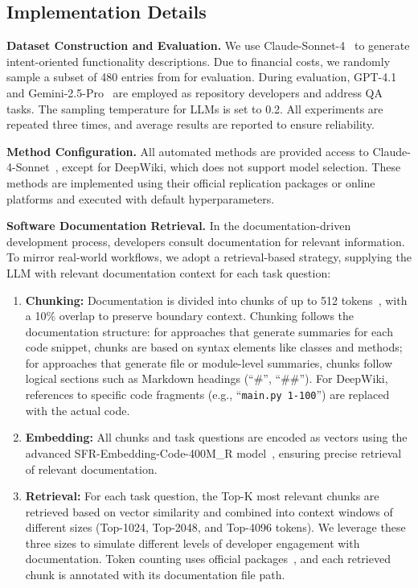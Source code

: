 \subsection{Implementation Details}
\label{sec:impl_detail}
\textbf{Dataset Construction and Evaluation.}
We use Claude-Sonnet-4~\cite{claude} to generate intent-oriented functionality descriptions. Due to financial costs, we randomly sample a subset of 480 entries from \benchmark for evaluation. During evaluation, GPT-4.1~\cite{gpt} and Gemini-2.5-Pro~\cite{gemini} are employed as repository developers and address QA tasks. The sampling temperature for LLMs is set to 0.2. All experiments are repeated three times, and average results are reported to ensure reliability.

\textbf{Method Configuration.}
All automated methods are provided access to Claude-4-Sonnet~\cite{claude}, except for DeepWiki, which does not support model selection. These methods are implemented using their official replication packages or online platforms and executed with default hyperparameters.



\textbf{Software Documentation Retrieval.}
In the documentation-driven development process, developers consult documentation for relevant information. To mirror real-world workflows, we adopt a retrieval-based strategy, supplying the LLM with relevant documentation context for each task question:

\begin{enumerate}[leftmargin=*]
\item \textbf{Chunking:} Documentation is divided into chunks of up to 512 tokens~\cite{sfr, coir}, with a 10\% overlap to preserve boundary context. Chunking follows the documentation structure: for approaches that generate summaries for each code snippet, chunks are based on syntax elements like classes and methods; for approaches that generate file or module-level summaries, chunks follow logical sections such as Markdown headings (``\#'', ``\#\#''). For DeepWiki, references to specific code fragments (e.g., ``\texttt{main.py 1-100}'') are replaced with the actual code.

\item \textbf{Embedding:} All chunks and task questions are encoded as vectors using the advanced SFR-Embedding-Code-400M\_R model~\cite{sfr}, ensuring precise retrieval of relevant documentation.

\item \textbf{Retrieval:} For each task question, the Top-K most relevant chunks are retrieved based on vector similarity and combined into context windows of different sizes (Top-1024, Top-2048, and Top-4096 tokens). We leverage these three sizes to simulate different levels of developer engagement with documentation. Token counting uses official packages~\cite{tiktoken, googlecloud}, and each retrieved chunk is annotated with its documentation file path.
\end{enumerate}




